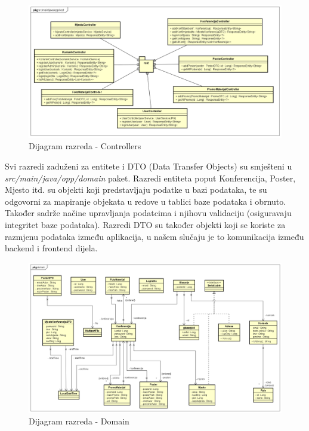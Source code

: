 		\begin{figure}[H]
			\includegraphics[width=\textwidth]{slike/controllersClassDiagram.PNG} %
			\caption{Dijagram razreda - Controllers}
			\label{fig:dr-controllers} %
		\end{figure}
		\newpage
		Svi razredi zaduženi za entitete i DTO (Data Transfer Objects) su smješteni u \textit{src/main/java/opp/domain} paket. Razredi entiteta poput Konferencija, Poster, Mjesto itd. su objekti koji predstavljaju podatke u bazi podataka, te su odgovorni za mapiranje objekata u redove u tablici baze podataka i obrnuto. Također sadrže načine upravljanja podatcima i njihovu validaciju (osiguravaju integritet baze podataka). Razredi DTO su također objekti koji se koriste za razmjenu podataka između aplikacija, u našem slučaju je to komunikacija između backend i frontend dijela.
		\begin{figure}[H]
			\includegraphics[width=\textwidth]{slike/domainClassDiagram.PNG} %
			\caption{Dijagram razreda - Domain}
			\label{fig:dr-domain} %
		\end{figure}
